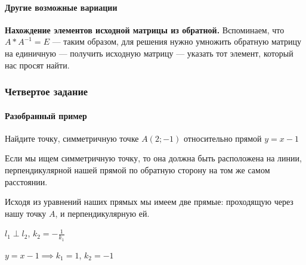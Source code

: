 \documentclass{article}
\begin{document}
\begin{flushleft}
\paragraph{Другие возможные вариации}

\textbf{Нахождение элементов исходной матрицы из обратной.} Вспоминаем, что $A * A^{-1} = E$ — таким образом, для решения нужно умножить обратную матрицу на единичную — получить исходную матрицу — указать тот элемент, который нас просят найти.

\pagebreak
\subsubsection{Четвертое задание}

\paragraph{Разобранный пример}

Найдите точку, симметричную точке $A(2; -1)$ относительно прямой $y = x - 1$

\def\size{5} %


Если мы ищем симметричную точку, то она должна быть расположена на линии, перпендикулярной нашей прямой по обратную сторону на том же самом расстоянии.

Исходя из уравнений наших прямых мы имеем две прямые: проходящую через нашу точку $A$, и перпендикулярную ей.

\bigskip

$l_1 \perp l_2$, $k_2 = -\frac{1}{k_1}$

$y = x - 1 \implies k_1 = 1$, $k_2 = -1$


\end{flushleft}
\end{document}
